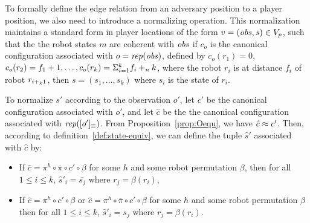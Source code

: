  To formally define the edge relation from an adversary position to 
 a player position, we also need to introduce a normalizing operation.
 This normalization maintains a standard form in player locations  of the form $v = (\mathit{obs}, s) \in V_p$, such that
the the robot states $m$ are coherent with $\mathit{obs}$ \ie if $c_o$ is the canonical configuration
associated with $o=\mathit{rep}(\mathit{obs})$, defined by $c_o(r_1)=0$, $c_o(r_2)=f_1+1, \dots, c_o(r_k) = \Sigma_{i=1}^k f_i +_n k$, 
where the robot $r_i$ is at distance $f_i$ of robot $r_{i +_k 1}$, then $s=(s_1, \ldots, s_k)$ where $s_i$ is the state of $r_i$.  


To normalize $s'$ according to the observation $o'$, %
let $c'$ be the canonical configuration associated with $o'$, %
and let $\hat{c}$ be the the canonical configuration associated with $\mathit{rep}([o']_{\equiv})$. 
From Proposition~\ref{prop:Oequ}, we have $\hat{c} \approx c'$. Then, according to definition~\ref{def:state-equiv}, 
we can define the tuple $\hat{s}'$ associated with $\hat{c}$ by: 
\begin{itemize}
\item If $\hat{c}= \pi^{h} \circ \overline \pi \circ c' \circ \beta$ for some $h$ and some robot permutation $\beta$, 
then for all $1 \leq i \leq k$, $\hat{s}'_i= \overline{s_j}$ where $r_j=\beta(r_i)$, 
\item If $\hat{c}= \pi^{h} \circ c' \circ \beta$ or $\hat{c}= \pi^{h} \circ \overline \pi \circ c' \circ \beta$ for some $h$ 
and some robot permutation $\beta$ then for all $1 \leq i \leq k$, $\hat{s}'_i= s_j$ where $r_j=\beta(r_i)$.
\end{itemize}
